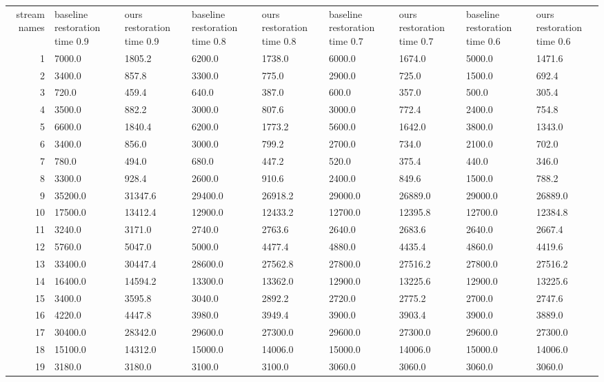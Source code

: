 \begin{tabular}{|r|l|l|l|l|l|l|l|l|}
  \hline
  stream names & baseline restoration time 0.9 & ours restoration time 0.9 & baseline restoration time 0.8 & ours restoration time 0.8 & baseline restoration time 0.7 & ours restoration time 0.7 & baseline restoration time 0.6 & ours restoration time 0.6 \\ 
  1 & 7000.0 & 1805.2 & 6200.0 & 1738.0 & 6000.0 & 1674.0 & 5000.0 & 1471.6 \\ 
  2 & 3400.0 & 857.8 & 3300.0 & 775.0 & 2900.0 & 725.0 & 1500.0 & 692.4 \\ 
  3 & 720.0 & 459.4 & 640.0 & 387.0 & 600.0 & 357.0 & 500.0 & 305.4 \\ 
  4 & 3500.0 & 882.2 & 3000.0 & 807.6 & 3000.0 & 772.4 & 2400.0 & 754.8 \\ 
  5 & 6600.0 & 1840.4 & 6200.0 & 1773.2 & 5600.0 & 1642.0 & 3800.0 & 1343.0 \\ 
  6 & 3400.0 & 856.0 & 3000.0 & 799.2 & 2700.0 & 734.0 & 2100.0 & 702.0 \\ 
  7 & 780.0 & 494.0 & 680.0 & 447.2 & 520.0 & 375.4 & 440.0 & 346.0 \\ 
  8 & 3300.0 & 928.4 & 2600.0 & 910.6 & 2400.0 & 849.6 & 1500.0 & 788.2 \\ 
  9 & 35200.0 & 31347.6 & 29400.0 & 26918.2 & 29000.0 & 26889.0 & 29000.0 & 26889.0 \\ 
  10 & 17500.0 & 13412.4 & 12900.0 & 12433.2 & 12700.0 & 12395.8 & 12700.0 & 12384.8 \\ 
  11 & 3240.0 & 3171.0 & 2740.0 & 2763.6 & 2640.0 & 2683.6 & 2640.0 & 2667.4 \\ 
  12 & 5760.0 & 5047.0 & 5000.0 & 4477.4 & 4880.0 & 4435.4 & 4860.0 & 4419.6 \\ 
  13 & 33400.0 & 30447.4 & 28600.0 & 27562.8 & 27800.0 & 27516.2 & 27800.0 & 27516.2 \\ 
  14 & 16400.0 & 14594.2 & 13300.0 & 13362.0 & 12900.0 & 13225.6 & 12900.0 & 13225.6 \\ 
  15 & 3400.0 & 3595.8 & 3040.0 & 2892.2 & 2720.0 & 2775.2 & 2700.0 & 2747.6 \\ 
  16 & 4220.0 & 4447.8 & 3980.0 & 3949.4 & 3900.0 & 3903.4 & 3900.0 & 3889.0 \\ 
  17 & 30400.0 & 28342.0 & 29600.0 & 27300.0 & 29600.0 & 27300.0 & 29600.0 & 27300.0 \\ 
  18 & 15100.0 & 14312.0 & 15000.0 & 14006.0 & 15000.0 & 14006.0 & 15000.0 & 14006.0 \\ 
  19 & 3180.0 & 3180.0 & 3100.0 & 3100.0 & 3060.0 & 3060.0 & 3060.0 & 3060.0 \\ 

\end{tabular}
